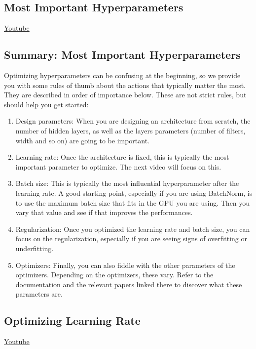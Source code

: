 \subsection{Most Important Hyperparameters}
\href{https://www.youtube.com/watch?v=QJi0ORH3k0E&ab_channel=Udacity}{Youtube}

\subsection{Summary: Most Important Hyperparameters}

Optimizing hyperparameters can be confusing at the beginning, so we provide you with some rules of thumb about the actions that typically matter the most. They are described in order of importance below. These are not strict rules, but should help you get started:

\begin{enumerate}
    \item Design parameters: When you are designing an architecture from scratch, the number of hidden layers, as well as the layers parameters (number of filters, width and so on) are going to be important.
    \item Learning rate: Once the architecture is fixed, this is typically the most important parameter to optimize. The next video will focus on this.
    \item Batch size: This is typically the most influential hyperparameter after the learning rate. A good starting point, especially if you are using BatchNorm, is to use the maximum batch size that fits in the GPU you are using. Then you vary that value and see if that improves the performances.
    \item Regularization: Once you optimized the learning rate and batch size, you can focus on the regularization, especially if you are seeing signs of overfitting or underfitting.
    \item Optimizers: Finally, you can also fiddle with the other parameters of the optimizers. Depending on the optimizers, these vary. Refer to the documentation and the relevant papers linked there to discover what these parameters are.
\end{enumerate}

\subsection{Optimizing Learning Rate}
\href{https://www.youtube.com/watch?v=nyFpT0Xj860&t=3s&ab_channel=Udacity}{Youtube}

